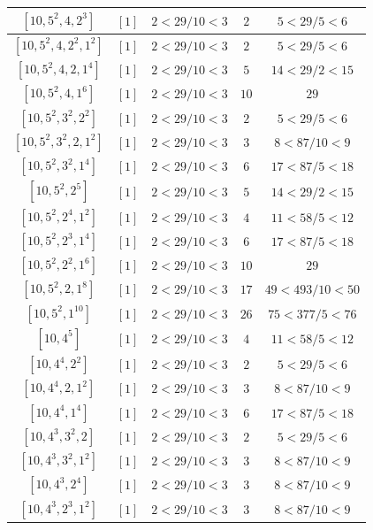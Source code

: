 \documentclass{article}%
\begin{document}
\begin{center}
\begin{longtable}{||c|c|c|c|c||}
$[10, 5^{2}, 4, 2^{3}]$ & $[1]$ & $2 < 29/10 < 3$ & $2$ & $5 < 29/5 < 6$ \\ \hline 
$[10, 5^{2}, 4, 2^{2}, 1^{2}]$ & $[1]$ & $2 < 29/10 < 3$ & $2$ & $5 < 29/5 < 6$ \\ \hline 
$[10, 5^{2}, 4, 2, 1^{4}]$ & $[1]$ & $2 < 29/10 < 3$ & $5$ & $14 < 29/2 < 15$ \\ \hline 
$[10, 5^{2}, 4, 1^{6}]$ & $[1]$ & $2 < 29/10 < 3$ & $10$ & $29$ \\ \hline 
$[10, 5^{2}, 3^{2}, 2^{2}]$ & $[1]$ & $2 < 29/10 < 3$ & $2$ & $5 < 29/5 < 6$ \\ \hline 
$[10, 5^{2}, 3^{2}, 2, 1^{2}]$ & $[1]$ & $2 < 29/10 < 3$ & $3$ & $8 < 87/10 < 9$ \\ \hline 
$[10, 5^{2}, 3^{2}, 1^{4}]$ & $[1]$ & $2 < 29/10 < 3$ & $6$ & $17 < 87/5 < 18$ \\ \hline 
$[10, 5^{2}, 2^{5}]$ & $[1]$ & $2 < 29/10 < 3$ & $5$ & $14 < 29/2 < 15$ \\ \hline 
$[10, 5^{2}, 2^{4}, 1^{2}]$ & $[1]$ & $2 < 29/10 < 3$ & $4$ & $11 < 58/5 < 12$ \\ \hline 
$[10, 5^{2}, 2^{3}, 1^{4}]$ & $[1]$ & $2 < 29/10 < 3$ & $6$ & $17 < 87/5 < 18$ \\ \hline 
$[10, 5^{2}, 2^{2}, 1^{6}]$ & $[1]$ & $2 < 29/10 < 3$ & $10$ & $29$ \\ \hline 
$[10, 5^{2}, 2, 1^{8}]$ & $[1]$ & $2 < 29/10 < 3$ & $17$ & $49 < 493/10 < 50$ \\ \hline 
$[10, 5^{2}, 1^{10}]$ & $[1]$ & $2 < 29/10 < 3$ & $26$ & $75 < 377/5 < 76$ \\ \hline 
$[10, 4^{5}]$ & $[1]$ & $2 < 29/10 < 3$ & $4$ & $11 < 58/5 < 12$ \\ \hline 
$[10, 4^{4}, 2^{2}]$ & $[1]$ & $2 < 29/10 < 3$ & $2$ & $5 < 29/5 < 6$ \\ \hline 
$[10, 4^{4}, 2, 1^{2}]$ & $[1]$ & $2 < 29/10 < 3$ & $3$ & $8 < 87/10 < 9$ \\ \hline 
$[10, 4^{4}, 1^{4}]$ & $[1]$ & $2 < 29/10 < 3$ & $6$ & $17 < 87/5 < 18$ \\ \hline 
$[10, 4^{3}, 3^{2}, 2]$ & $[1]$ & $2 < 29/10 < 3$ & $2$ & $5 < 29/5 < 6$ \\ \hline 
$[10, 4^{3}, 3^{2}, 1^{2}]$ & $[1]$ & $2 < 29/10 < 3$ & $3$ & $8 < 87/10 < 9$ \\ \hline 
$[10, 4^{3}, 2^{4}]$ & $[1]$ & $2 < 29/10 < 3$ & $3$ & $8 < 87/10 < 9$ \\ \hline 
$[10, 4^{3}, 2^{3}, 1^{2}]$ & $[1]$ & $2 < 29/10 < 3$ & $3$ & $8 < 87/10 < 9$ \\ \hline 

\end{longtable}
\end{center}
\end{document}
